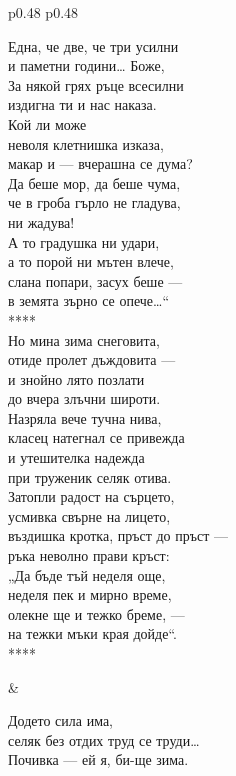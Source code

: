 \documentclass[12pt,a4paper]{article}
\begin{document}
\begin{tabular}{p{0.48\textwidth} p{0.48\textwidth}}
\begin{minipage}[t]{\linewidth}
Една, че две, че три усилни\\
и паметни години… Боже,\\
За някой грях ръце всесилни\\
издигна ти и нас наказа.\\
Кой ли може\\
неволя клетнишка изказа,\\
макар и — вчерашна се дума?\\
Да беше мор, да беше чума,\\
че в гроба гърло не гладува,\\
ни жадува!\\
А то градушка ни удари,\\
а то порой ни мътен влече,\\
слана попари, засух беше —\\
в земята зърно се опече…“\\
****\\
Но мина зима снеговита,\\
отиде пролет дъждовита —\\
и знойно лято позлати\\
до вчера злъчни широти.\\
Назряла вече тучна нива,\\
класец натегнал се привежда\\
и утешителка надежда\\
при труженик селяк отива.\\
Затопли радост на сърцето,\\
усмивка свърне на лицето,\\
въздишка кротка, пръст до пръст —\\
ръка неволно прави кръст:\\
„Да бъде тъй неделя още,\\
неделя пек и мирно време,\\
олекне ще и тежко бреме, —\\
на тежки мъки края дойде“.\\
****\\
\end{minipage}
&
\begin{minipage}[t]{\linewidth}
Додето сила има,\\
селяк без отдих труд се труди…\\
Почивка — ей я, би-ще зима.\\

\end{minipage}
\end{tabular}
\end{document}
